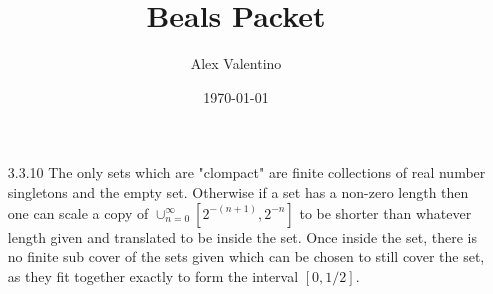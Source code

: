 \documentclass[12pt, letterpaper]{article}
\date{\today}
\author{Alex Valentino}
\title{Beals Packet}
\begin{document}
	\begin{enumerate}
		\item[3.3.10] The only sets which are "clompact" are finite collections of
		real number singletons and the empty set.  Otherwise if a set has a non-zero length 
		then one can scale a copy of $\cup_{n = 0}^\infty [2^{-(n+1)}, 2^{-n}]$ to be shorter than whatever length given and translated to be inside the set.  Once 
		inside the set, there is no finite sub cover of the sets given which can 
		be chosen to still cover the set, as they fit together exactly to form the 
		interval $[0,1/2]$.    
	\end{enumerate}
\end{document}
